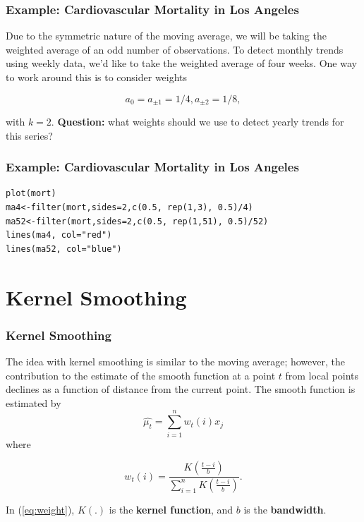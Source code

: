 \documentclass[%
xcolor=pdftex]{beamer}
\begin{document}
\begin{frame}
\frametitle{Example: Cardiovascular Mortality in Los Angeles}

Due to the symmetric nature of the moving average, we will be taking the weighted average of an odd number of observations. To detect monthly trends using weekly data, we'd like to take the weighted average of four weeks. One way to work around this is to consider weights

$$
a_0 = a_{\pm1} = 1/4, a_{\pm2} = 1/8,
$$

with $k=2$. \textbf{Question:} what weights should we use to detect yearly trends for this series?

\end{frame}

\begin{frame}[fragile]
\frametitle{Example: Cardiovascular Mortality in Los Angeles}

\begin{verbatim}
plot(mort)
ma4<-filter(mort,sides=2,c(0.5, rep(1,3), 0.5)/4)
ma52<-filter(mort,sides=2,c(0.5, rep(1,51), 0.5)/52)
lines(ma4, col="red")
lines(ma52, col="blue")
\end{verbatim}

\end{frame}

\section{Kernel Smoothing}
\frame{\tableofcontents[currentsection]}

\begin{frame}
\frametitle{Kernel Smoothing}

The idea with kernel smoothing is similar to the moving average; however, the contribution to the estimate of the smooth function at a point $t$ from local points declines as a function of distance from the current point.  The smooth function is estimated by
\begin{equation}
\hat{\mu_t}=\sum_{i=1}^n w_t(i) x_j
\end{equation}
where

\begin{equation} \label{eq:weight}
w_t(i)=\frac{K\left( \frac{t-i}{b} \right)}{ \sum_{i=1}^n K\left( \frac{t-i}{b} \right)}.
\end{equation}

In (\ref{eq:weight}), $K(.)$ is the \textbf{kernel function}, and $b$ is the \textbf{bandwidth}.

\end{frame}
\end{document}
